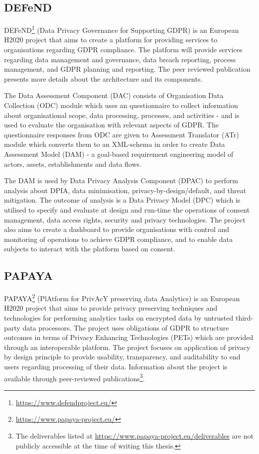 \subsection*{DEFeND}
DEFeND\footnote{\url{https://www.defendproject.eu/}} (Data Privacy Governance for Supporting GDPR) is an European H2020 project that aims to create a platform for providing services to organisations regarding GDPR compliance. The platform will provide services regarding data management and governance, data breach reporting, process management, and GDPR planning and reporting. The peer reviewed publication \cite{piras_defend_2019} presents more details about the architecture and its components.

The Data Assessment Component (DAC) consists of Organisation Data Collection (ODC) module which uses an questionnaire to collect information about organisational scope, data processing, processes, and activities - and is used to evaluate the organisation with relevant aspects of GDPR. The questionnaire responses from ODC are given to Assessment Translator (ATr) module which converts them to an XML-schema in order to create Data Assessment Model (DAM) - a goal-based requirement engineering model of actors, assets, establishments and data flows.

The DAM is used by Data Privacy Analysis Component (DPAC) to perform analysis about DPIA, data minimisation, privacy-by-design/default, and threat mitigation. The outcome of analysis is a Data Privacy Model (DPC) which is utilised to specify and evaluate at design and run-time the operations of consent management, data access rights, security and privacy technologies. The project also aims to create a dashboard to provide organisations with control and monitoring of operations to achieve GDPR compliance, and to enable data subjects to interact with the platform based on consent.

\subsection*{PAPAYA}
PAPAYA\footnote{\url{https://www.papaya-project.eu/}} (PlAtform for PrivAcY preserving data Analytics) is an European H2020 project that aims to provide privacy preserving techniques and technologies for performing analytics tasks on encrypted data by untrusted third-party data processors. The project uses obligations of GDPR to structure outcomes in terms of Privacy Enhancing Technologies (PETs) which are provided through an interoperable platform. The project focuses on application of privacy by design principle to provide usability, transparency, and auditability to end users regarding processing of their data. Information about the project is available through peer-reviewed publications\footnote{The deliverables listed at \url{https://www.papaya-project.eu/deliverables} are not publicly accessible at the time of writing this thesis.}.

